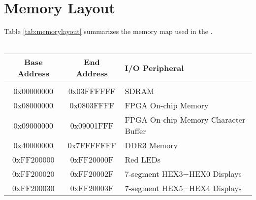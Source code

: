 

\section{Memory Layout}

\noindent
Table \ref{tab:memorylayout} summarizes the memory map used in the \systemName.
~\\
~\\

\begin{table}[h]
    \begin{center}
    \begin{tabular}{c|c|l}
            \textbf{Base Address}
            & \textbf{End Address}
            & \textbf{I/O Peripheral}
				\\\hline\vspace{-3mm}\\
            0x00000000
            & 0x03FFFFFF
            & SDRAM
        \\
            0x08000000
            & 0x0803FFFF
            & FPGA On-chip Memory
        \\
            0x09000000
            & 0x09001FFF
            & FPGA On-chip Memory Character Buffer
        \\
            0x40000000
            & 0x7FFFFFFF
            & DDR3 Memory
        \\
            0xFF200000
            & 0xFF20000F
            & Red LEDs
        \\
            0xFF200020
            & 0xFF20002F
            & 7-segment HEX3$-$HEX0 Displays
        \\
            0xFF200030
            & 0xFF20003F
            & 7-segment HEX5$-$HEX4 Displays


\end{tabular}
\end{center}
\end{table}
